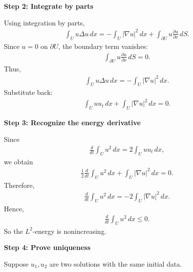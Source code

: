 \documentclass[12pt,a4paper]{report}
\begin{document}
\begin{description}
\begin{description}
\item \textbf{Step 2: Integrate by parts}

Using integration by parts,
\begin{align*}
\int_U u\Delta u\,dx = -\int_U |\nabla u|^2\,dx + \int_{\partial U}u\frac{\partial u}{\partial\nu}\,dS.
\end{align*}
Since $u=0$ on $\partial U$, the boundary term vanishes:
\begin{align*}
\int_{\partial U}u\frac{\partial u}{\partial\nu}\,dS=0.
\end{align*}
Thus,
\begin{align*}
\int_U u\Delta u\,dx = -\int_U |\nabla u|^2\,dx.
\end{align*}
Substitute back:
\begin{align*}
\int_U uu_t\,dx+\int_U |\nabla u|^2\,dx=0.
\end{align*}

\item \textbf{Step 3: Recognize the energy derivative}

Since
\begin{align*}
\frac{d}{dt}\int_U u^2\,dx = 2\int_U uu_t\,dx,
\end{align*}
we obtain
\begin{align*}
\frac12\frac{d}{dt}\int_U u^2\,dx+\int_U |\nabla u|^2\,dx=0.
\end{align*}
Therefore,
\begin{align*}
\frac{d}{dt}\int_U u^2\,dx = -2\int_U |\nabla u|^2\,dx.
\end{align*}
Hence,
\begin{align*}
\boxed{
\frac{d}{dt}\int_U u^2\,dx\le 0.
}
\end{align*}
So the $L^2$-energy is nonincreasing.

\item \textbf{Step 4: Prove uniqueness}

Suppose $u_1,u_2$ are two solutions with the same initial data.


\end{description}
\end{description}
\end{document}
